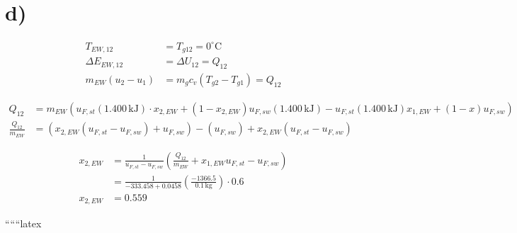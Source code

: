 

\section*{d)}

\begin{align*}
T_{EW,12} &= T_{g12} = 0^\circ \text{C} \\
\Delta E_{EW,12} &= \Delta U_{12} = Q_{12} \\
m_{EW} (u_2 - u_1) &= m_g c_v (T_{g2} - T_{g1}) = Q_{12}
\end{align*}

\begin{align*}
Q_{12} &= m_{EW} \left( u_{F,st} (1.400 \, \text{kJ}) \cdot x_{2,EW} + (1 - x_{2,EW}) u_{F,sw} (1.400 \, \text{kJ}) - u_{F,st} (1.400 \, \text{kJ}) x_{1,EW} + (1 - x) u_{F,sw} \right) \\
\frac{Q_{12}}{m_{EW}} &= \left( x_{2,EW} (u_{F,st} - u_{F,sw}) + u_{F,sw} \right) - (u_{F,sw}) + x_{2,EW} (u_{F,st} - u_{F,sw})
\end{align*}

\begin{align*}
x_{2,EW} &= \frac{1}{u_{F,st} - u_{F,sw}} \left( \frac{Q_{12}}{m_{EW}} + x_{1,EW} u_{F,st} - u_{F,sw} \right) \\
&= \frac{1}{-333.458 + 0.0458} \left( \frac{-1366.5}{0.1 \, \text{kg}} \right) \cdot 0.6 \\
x_{2,EW} &= 0.559
\end{align*}

``````latex